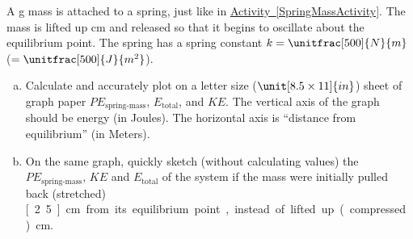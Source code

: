 \label{fnt2.3.1-2}

A \unit[200]{g} mass is attached to a spring, just like in \hyperref[SpringMassActivity]{Activity~\ref{SpringMassActivity}}. The mass is lifted up \unit[5]{cm} and released so that it begins to oscillate about the equilibrium point. The spring has a spring constant $k = \unitfrac[500]{N}{m}$ ($= \unitfrac[500]{J}{m^2}$).

\begin{enumerate}[(a)]
	\item Calculate and accurately plot on a letter size ($\unit[8.5 \times 11]{in}$) sheet of graph paper $PE_\text{spring-mass}$, $E_\text{total}$, and $KE$. The vertical axis of the graph should be energy (in Joules). The horizontal axis is ``distance from equilibrium'' (in Meters). 

	\item On the same graph, quickly sketch (without calculating values) the $PE_\text{spring-mass}$, $KE$ and $E_\text{total}$ of the system if the mass were initially pulled back (stretched) \unit[2.5]{cm} from its equilibrium point, instead of lifted up (compressed) \unit[5]{cm}.
\end{enumerate}